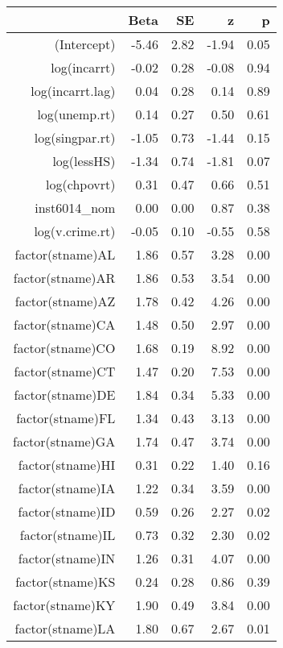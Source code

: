 \begin{table}[ht]
\centering
\begin{tabular}{rrrrr}
  \hline
 & Beta & SE & z & p \\ 
  \hline
(Intercept) & -5.46 & 2.82 & -1.94 & 0.05 \\ 
  log(incarrt) & -0.02 & 0.28 & -0.08 & 0.94 \\ 
  log(incarrt.lag) & 0.04 & 0.28 & 0.14 & 0.89 \\ 
  log(unemp.rt) & 0.14 & 0.27 & 0.50 & 0.61 \\ 
  log(singpar.rt) & -1.05 & 0.73 & -1.44 & 0.15 \\ 
  log(lessHS) & -1.34 & 0.74 & -1.81 & 0.07 \\ 
  log(chpovrt) & 0.31 & 0.47 & 0.66 & 0.51 \\ 
  inst6014\_nom & 0.00 & 0.00 & 0.87 & 0.38 \\ 
  log(v.crime.rt) & -0.05 & 0.10 & -0.55 & 0.58 \\ 
  factor(stname)AL & 1.86 & 0.57 & 3.28 & 0.00 \\ 
  factor(stname)AR & 1.86 & 0.53 & 3.54 & 0.00 \\ 
  factor(stname)AZ & 1.78 & 0.42 & 4.26 & 0.00 \\ 
  factor(stname)CA & 1.48 & 0.50 & 2.97 & 0.00 \\ 
  factor(stname)CO & 1.68 & 0.19 & 8.92 & 0.00 \\ 
  factor(stname)CT & 1.47 & 0.20 & 7.53 & 0.00 \\ 
  factor(stname)DE & 1.84 & 0.34 & 5.33 & 0.00 \\ 
  factor(stname)FL & 1.34 & 0.43 & 3.13 & 0.00 \\ 
  factor(stname)GA & 1.74 & 0.47 & 3.74 & 0.00 \\ 
  factor(stname)HI & 0.31 & 0.22 & 1.40 & 0.16 \\ 
  factor(stname)IA & 1.22 & 0.34 & 3.59 & 0.00 \\ 
  factor(stname)ID & 0.59 & 0.26 & 2.27 & 0.02 \\ 
  factor(stname)IL & 0.73 & 0.32 & 2.30 & 0.02 \\ 
  factor(stname)IN & 1.26 & 0.31 & 4.07 & 0.00 \\ 
  factor(stname)KS & 0.24 & 0.28 & 0.86 & 0.39 \\ 
  factor(stname)KY & 1.90 & 0.49 & 3.84 & 0.00 \\ 
  factor(stname)LA & 1.80 & 0.67 & 2.67 & 0.01 \\ 

\end{tabular}
\end{table}
